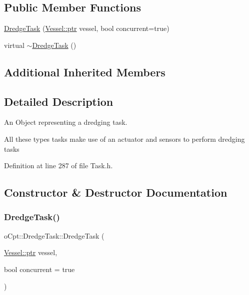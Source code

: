 \subsection*{Public Member Functions}
\begin{DoxyCompactItemize}
\item 
\hyperlink{classo_cpt_1_1_dredge_task_a959ef09f846314a23a9ad31be807f2d1}{Dredge\+Task} (\hyperlink{classo_cpt_1_1i_vessel_a43711a596f3bdfd0ca732ed3901edc97}{Vessel\+::ptr} vessel, bool concurrent=true)
\item 
virtual \hyperlink{classo_cpt_1_1_dredge_task_aa326cf6ddbb6e3019fb86f8d714bf323}{$\sim$\+Dredge\+Task} ()
\end{DoxyCompactItemize}
\subsection*{Additional Inherited Members}


\subsection{Detailed Description}
An Object representing a dredging task. 

All these types tasks make use of an actuator and sensors to perform dredging tasks 

Definition at line 287 of file Task.\+h.



\subsection{Constructor \& Destructor Documentation}
\hypertarget{classo_cpt_1_1_dredge_task_a959ef09f846314a23a9ad31be807f2d1}{}\label{classo_cpt_1_1_dredge_task_a959ef09f846314a23a9ad31be807f2d1} 
\subsubsection{\texorpdfstring{Dredge\+Task()}{DredgeTask()}}
{\footnotesize\ttfamily o\+Cpt\+::\+Dredge\+Task\+::\+Dredge\+Task (\begin{DoxyParamCaption}\item[{\hyperlink{classo_cpt_1_1i_vessel_a43711a596f3bdfd0ca732ed3901edc97}{Vessel\+::ptr}}]{vessel,  }\item[{bool}]{concurrent = {\ttfamily true} }\end{DoxyParamCaption})}

